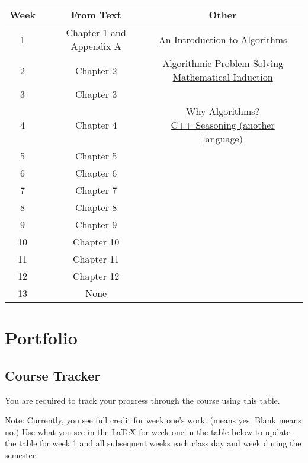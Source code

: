 \documentclass[12pt]{amsart}
\begin{document}
\begin{table}[ht]
\begin{center}
\begin{tabular}{|c|c|c|c|}
	\hline
   \rowcolor[gray]{.9}
	Week & From Text & Other \\
	\hline
	 1 & Chapter 1 and Appendix A & \href{https://byui-cse.github.io/cse381-course/support_files/alg_intro.pdf}{An Introduction to Algorithms}\\
	\hline
	 2 & Chapter 2 & \makecell{
	\href{https://byui-cse.github.io/cse381-course/support_files/aps.pdf}{Algorithmic Problem Solving}\\
	\href{https://byui-cse.github.io/cse381-course/support_files/Induction.pdf}{Mathematical Induction}}\\ 
	\hline
	3 & Chapter 3 &\\
	\hline
	4 & Chapter 4 &\makecell{\href{https://developer.apple.com/videos/play/wwdc2018/223/}{Why Algorithms?} \\ \href{https://www.youtube.com/watch?v=W2tWOdzgXHA}{C++ Seasoning (another language)}}\\
	\hline
	5 & Chapter 5 &\\
	\hline
	6 & Chapter 6 &\\
	\hline
	7 & Chapter 7 &\\
	\hline
	8 & Chapter 8 &\\
	\hline
	9 & Chapter 9 &\\
	\hline
	10 & Chapter 10 &\\
	\hline
	11 & Chapter 11 &\\
	\hline
	12 & Chapter 12 &\\
	\hline
	13 & None &\\
	\hline
\end{tabular}
\end{center}
\end{table}
\newpage
\section{Portfolio}
\subsection{Course Tracker}

You are required to track your progress through the course using this table. 

Note: Currently, you see full credit for week one's work. (\checkmark means yes. Blank means no.) Use what you see in the \LaTeX{} for week one in the table below to update the table for week 1 and all subsequent weeks each class day and week during the semester.
\end{document}
